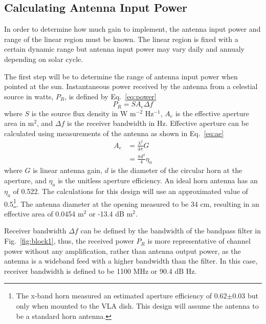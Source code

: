 \documentclass[titlepage]{article}
\begin{document}
\subsection{Calculating Antenna Input Power}
In order to determine how much gain to implement, the antenna input power and range of the linear region must be known. The linear region is fixed with a certain dynamic range but antenna input power may vary daily and annualy depending on solar cycle\cite[Fig.~2]{solartemp}.

The first step will be to determine the range of antenna input power when pointed at the sun. Instantaneous power received by the antenna from a celestial source in watts, $P_R$, is defined by Eq.~\ref{eq:power}
\begin{equation}
    P_R = S A_e \Delta f
\label{eq:power}
\end{equation}
where $S$ is the source flux density in W m$^{-2}$ Hz$^{-1}$, $A_e$ is the effective aperture area in m$^2$, and $\Delta f$ is the receiver bandwidth in Hz\cite[eq.~(41-2)]{aeh}. Effective aperture can be calculated using measurements of the antenna as shown in Eq.~\ref{eq:ae}
\begin{equation} \label{eq:ae}
\begin{split}
    A_e &= \frac{\lambda^2}{4\pi}G \\
    &= \frac{\pi d^2}{4} \eta_a
\end{split}
\end{equation}
where $G$ is linear antenna gain, $d$ is the diameter of the circular horn at the aperture, and $\eta_a$ is the unitless aperture efficiency\cite[pg.~(15-27)]{aeh}\cite[eq.~(5.58)]{tora}. An ideal horn antenna has an $\eta_a$ of 0.522. The calculations for this design will use an approximated value of 0.5\footnote{The x-band horn measured an estimated aperture efficiency of 0.62$\pm$0.03 but only when mounted to the VLA dish\cite{xbandvla}. This design will assume the antenna to be a standard horn antenna.}. The antenna diameter at the opening measured to be 34 cm, resulting in an effective area of 0.0454 m$^2$ or -13.4 dB m$^2$.

Receiver bandwidth $\Delta f$ can be defined by the bandwidth of the bandpass filter in Fig.~\ref{fig:block1}, thus, the received power $P_R$ is more representative of channel power without any amplification, rather than antenna output power, as the antenna is a wideband feed with a higher bandwidth than the filter. In this case, receiver bandwidth is defined to be 1100 MHz or 90.4 dB Hz.
\end{document}
